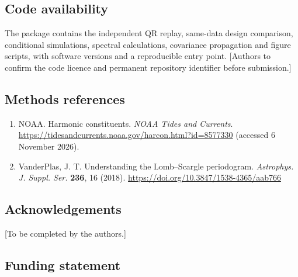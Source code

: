 \documentclass[
  12pt,
  a4paper,
]{article}
\providecommand{\tightlist}{%
  \setlength{\itemsep}{0pt}\setlength{\parskip}{0pt}}
\begin{document}
\singlespacing\fontsize{11}{13}\selectfont

\hypertarget{code-availability}{%
\subsection{Code availability}\label{code-availability}}

The package contains the independent QR replay, same-data design
comparison, conditional simulations, spectral calculations, covariance
propagation and figure scripts, with software versions and a
reproducible entry point. {[}Authors to confirm the code licence and
permanent repository identifier before submission.{]}

\singlespacing\fontsize{11}{13}\selectfont

\hypertarget{methods-references}{%
\subsection{Methods references}\label{methods-references}}

\begin{enumerate}
\def\labelenumi{\arabic{enumi}.}
\setcounter{enumi}{22}
\tightlist
\item
  NOAA. Harmonic constituents. \emph{NOAA Tides and Currents}.
  \url{https://tidesandcurrents.noaa.gov/harcon.html?id=8577330}
  (accessed 6 November 2026).
\item
  VanderPlas, J. T. Understanding the Lomb--Scargle periodogram.
  \emph{Astrophys. J. Suppl. Ser.} \textbf{236}, 16 (2018).
  \url{https://doi.org/10.3847/1538-4365/aab766}
\end{enumerate}

\clearpage

\singlespacing\fontsize{11}{13}\selectfont

\hypertarget{acknowledgements}{%
\subsection{Acknowledgements}\label{acknowledgements}}

{[}To be completed by the authors.{]}

\singlespacing\fontsize{11}{13}\selectfont

\hypertarget{funding-statement}{%
\subsection{Funding statement}\label{funding-statement}}
\end{document}
